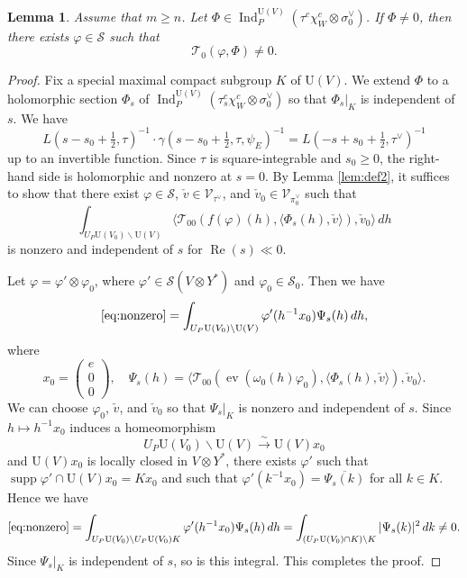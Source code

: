 \documentclass[11pt]{amsart}
\numberwithin{equation}{section}
\theoremstyle{plain}
\newtheorem{lem}[thm]{Lemma}
\theoremstyle{definition}
\theoremstyle{remark}
\def\ev{\operatorname{ev}}
\def\Ind{\operatorname{Ind}}
\def\Re{\operatorname{Re}}
\def\supp{\operatorname{supp}}
\def\U{\mathrm{U}}
\def\T{\mathcal{T}}
\def\s{\mathscr{S}}
\def\V{\mathscr{V}}
\begin{document}
\begin{lem}
\label{lem:nonzero}
Assume that $m \ge n$.
Let $\Phi \in \Ind^{\U(V)}_P(\tau^c \chi_W^c \otimes \sigma_0^\vee)$.
If $\Phi \ne 0$, then there exists $\varphi \in \s$ such that
\[
 \T_0(\varphi, \Phi) \ne 0.
\]
\end{lem}

\begin{proof}
Fix a special maximal compact subgroup $K$ of $\U(V)$.
We extend $\Phi$ to a holomorphic section $\Phi_s$ of $\Ind^{\U(V)}_P(\tau_s^c \chi_W^c \otimes \sigma_0^\vee)$ so that $\Phi_s|_K$ is independent of $s$.
We have 
\[
 L(s-s_0+\tfrac{1}{2}, \tau)^{-1} \cdot 
 \gamma(s-s_0+\tfrac{1}{2}, \tau, \psi_E)^{-1} 
 = L(-s+s_0+\tfrac{1}{2}, \tau^\vee)^{-1}
\]
up to an invertible function.
Since $\tau$ is square-integrable and $s_0 \ge 0$, the right-hand side is holomorphic and nonzero at $s=0$.
By Lemma \ref{lem:def2}, 
it suffices to show that there exist $\varphi \in \s$,
$\check{v} \in \V_{\tau^\vee}$, and $\check{v}_0 \in \V_{\pi_0^\vee}$ such that 
\begin{equation}
\label{eq:nonzero}
 \int_{U_P \U(V_0) \backslash \U(V)}
 \langle \T_{00}(f(\varphi)(h), \langle \Phi_s(h), \check{v} \rangle ), \check{v}_0 \rangle \, dh
\end{equation}
is nonzero and independent of $s$ for $\Re(s) \ll 0$.

Let $\varphi = \varphi' \otimes \varphi_0$,
where $\varphi' \in \s(V \otimes Y^*)$ and $\varphi_0 \in \s_0$.
Then we have
\[
 \eqref{eq:nonzero} = 
 \int_{U_P \U(V_0) \backslash \U(V)} \varphi'(h^{-1} x_0) \Psi_s(h) \, dh,
\]
where
\[
 x_0 = 
 \begin{pmatrix}
  e \\
  0 \\
  0
 \end{pmatrix}, \quad
 \Psi_s(h) = \langle \T_{00}(\ev(\omega_0(h) \varphi_0), \langle \Phi_s(h), \check{v} \rangle ), \check{v}_0 \rangle.
\]
We can choose $\varphi_0$, $\check{v}$, and $\check{v}_0$ so that 
$\Psi_s|_K$ is nonzero and independent of $s$.
Since $h \mapsto h^{-1} x_0$ induces a homeomorphism
\[
 U_P \U(V_0) \backslash \U(V) \overset{\sim}{\longrightarrow} \U(V) x_0
\]
and $\U(V) x_0$ is locally closed in $V \otimes Y^*$,
there exists $\varphi'$ such that $\supp \varphi' \cap \U(V) x_0 = K x_0$
and such that $\varphi'(k^{-1} x_0) = \overline{\Psi_s(k)}$ for all $k \in K$.
Hence we have
\[
 \eqref{eq:nonzero} =
 \int_{U_P \U(V_0) \backslash U_P \U(V_0) K} \varphi'(h^{-1} x_0) \Psi_s(h) \, dh
 = \int_{(U_P \U(V_0) \cap K) \backslash K} |\Psi_s(k)|^2 \, dk \ne 0.
\]
Since $\Psi_s|_K$ is independent of $s$, so is this integral.
This completes the proof.
\end{proof}
\end{document}
